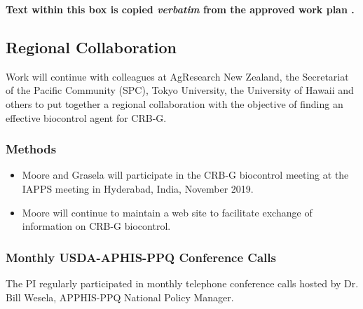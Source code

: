 \documentclass[12pt,letterpaper,english,bibliography=totocnumbered,abstract=on]{scrartcl}
\begin{document}
%
%




\newpage\begin{framed}
	
\textbf{Text within this box is copied \emph{verbatim} from the approved work plan \cite{mooreWorkPlanAPHISPPA2020}.} 

\subsection{Regional Collaboration}\label{sec:regional-collaboration}

Work will continue with colleagues at AgResearch New Zealand, the Secretariat of the Pacific Community (SPC), Tokyo University, the University of Hawaii and others to put together a regional collaboration with the objective of finding an effective biocontrol agent for CRB-G.

\subsubsection*{Methods}

\begin{itemize}
	\item Moore and Grasela will participate in the CRB-G biocontrol meeting at the IAPPS meeting in Hyderabad, India, November 2019.
	\item Moore will continue to maintain a web site to facilitate exchange of information on CRB-G biocontrol.
\end{itemize}
\end{framed}

\subsubsection{Monthly USDA-APHIS-PPQ Conference Calls}

The PI regularly participated in monthly telephone conference calls hosted by Dr. Bill Wesela, APPHIS-PPQ National Policy Manager.
\end{document}
